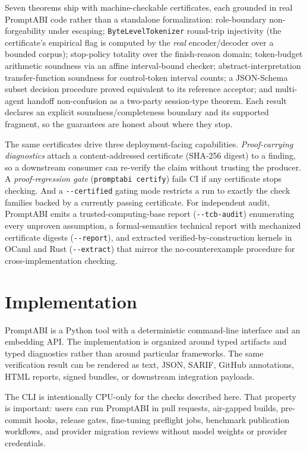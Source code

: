 \documentclass[10pt]{article}
\begin{document}
Seven theorems ship with machine-checkable certificates, each grounded in real
PromptABI code rather than a standalone formalization: role-boundary
non-forgeability under escaping; \texttt{ByteLevelTokenizer} round-trip
injectivity (the certificate's empirical flag is computed by the \emph{real}
encoder/decoder over a bounded corpus); stop-policy totality over the
finish-reason domain; token-budget arithmetic soundness via an affine
interval-bound checker; abstract-interpretation transfer-function soundness for
control-token interval counts; a JSON-Schema subset decision procedure proved
equivalent to its reference acceptor; and multi-agent handoff non-confusion as a
two-party session-type theorem. Each result declares an explicit
soundness/completeness boundary and its supported fragment, so the guarantees are
honest about where they stop.

The same certificates drive three deployment-facing capabilities.
\emph{Proof-carrying diagnostics} attach a content-addressed certificate
(SHA-256 digest) to a finding, so a downstream consumer can re-verify the claim
without trusting the producer. A \emph{proof-regression gate}
(\texttt{promptabi certify}) fails CI if any certificate stops checking. And a
\texttt{-{}-certified} gating mode restricts a run to exactly the check families
backed by a currently passing certificate. For independent audit, PromptABI emits
a trusted-computing-base report (\texttt{-{}-tcb-audit}) enumerating every
unproven assumption, a formal-semantics technical report with mechanized
certificate digests (\texttt{-{}-report}), and extracted verified-by-construction
kernels in OCaml and Rust (\texttt{-{}-extract}) that mirror the
no-counterexample procedure for cross-implementation checking.


\section{Implementation}

PromptABI is a Python tool with a deterministic command-line interface and an
embedding API. The implementation is organized around typed artifacts and typed
diagnostics rather than around particular frameworks. The same verification
result can be rendered as text, JSON, SARIF, GitHub annotations, HTML reports,
signed bundles, or downstream integration payloads.

The CLI is intentionally CPU-only for the checks described here. That property
is important: users can run PromptABI in pull requests, air-gapped builds,
pre-commit hooks, release gates, fine-tuning preflight jobs, benchmark
publication workflows, and provider migration reviews without model weights or
provider credentials.
\end{document}
